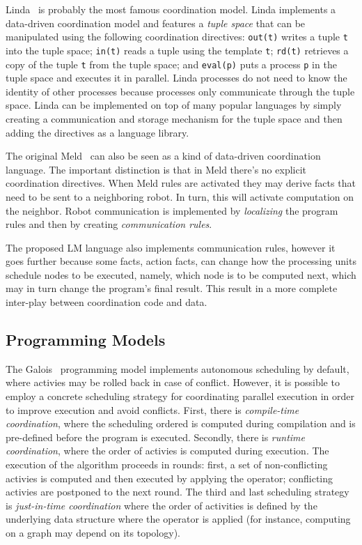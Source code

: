 Linda~\cite{linda} is probably the most famous coordination model. Linda implements a data-driven coordination model
and features a \emph{tuple space} that can be manipulated using the following coordination directives: \texttt{out(t)}
writes a tuple \texttt{t} into the tuple space; \texttt{in(t)} reads a tuple using the template \texttt{t}; \texttt{rd(t)} retrieves
a copy of the tuple \texttt{t} from the tuple space; and \texttt{eval(p)} puts a process \texttt{p} in the tuple space and executes it in parallel.
Linda processes do not need to know the identity of other processes because processes only communicate through the tuple space.
Linda can be implemented on top of many popular languages by simply creating a communication and storage mechanism for the tuple space
and then adding the directives as a language library.

The original Meld~\cite{ashley-rollman-iclp09} can also be seen as a kind of data-driven coordination language. The important distinction is that
in Meld there's no explicit coordination directives. When Meld rules are activated they may derive facts that need to be sent to a neighboring robot. In turn, this will activate computation on the neighbor. Robot communication is implemented by \emph{localizing} the program rules
and then by creating \emph{communication rules}.

The proposed LM language also implements communication rules, however it goes further because
some facts, action facts, can change how the processing units schedule nodes to be executed, namely, which node is to be computed next, which may in turn change
the program's final result. This result in a more complete inter-play between coordination code and data.

\subsection{Programming Models}

The Galois~\cite{Pingali:2011:TPA:1993316.1993501} programming model implements
autonomous scheduling by default, where activies may be rolled back in case of
conflict. However, it is possible to employ a concrete scheduling strategy for
coordinating parallel execution in order to improve execution and avoid
conflicts.
First, there is \emph{compile-time coordination}, where the scheduling ordered
is computed during compilation and is pre-defined before the program is
executed. Secondly, there is \emph{runtime coordination}, where the order of
activies is computed during execution. The execution of the algorithm proceeds
in rounds: first, a set of non-conflicting activies is computed and then
executed by applying the operator; conflicting activies are postponed to the
next round. The third and last scheduling strategy is \emph{just-in-time
coordination} where the order of activities is defined by the underlying data
structure where the operator is applied (for instance, computing on a graph may
depend on its topology).

